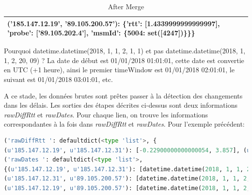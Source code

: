 \begin{landscape}
\begin{table}[H]
{\begin{tabular}{|l|}
							('185.147.12.19', '89.105.200.57'): \{'rtt': [1.4339999999999997], 'probe': ['89.105.202.4'], 'msmId': \{5004: set([4247])\}\}\}
							\\ \hline
						\end{tabular}
					}
					\caption{After Merge}
					\label{tab:aftermergee}
				\end{table}
				
						\begin{table}[H]
							\centering
						\end{table}
Pourquoi datetime.datetime(2018, 1, 1, 2, 1, 1) et pas datetime.datetime(2018, 1, 1, 2, 20, 09) ? 
La date de début est 01/01/2018 01:01:01, cette date est convertie en UTC (+1 heure), ainsi le premier timeWindow est 01/01/2018 02:01:01, le suivant est 01/01/2018 03:01:01, etc.

A ce stade, les données brutes sont prêtes passer à la détection des changements dans les délais. Les sorties des étapes décrites ci-dessus sont deux informations \textit{rawDiffRtt} et \textit{rawDates}. Pour chaque lien, on trouve les informations correspondantes à la fois dans \textit{rawDiffRtt} et \textit{rawDates}. Pour l'exemple précédent:

\begin{lstlisting}[language=Python]
('rawDiffRtt ': defaultdict(<type 'list'>, {
(u'185.147.12.19', u'185.147.12.31'): [-0.22900000000000054, 3.857], (u'185.147.12.31', u'89.105.200.57'): [1.6630000000000003], (u'185.147.12.19', u'89.105.200.57'): [1.4339999999999997]}))
('rawDates ': defaultdict(<type 'list'>, 
{(u'185.147.12.19', u'185.147.12.31'): [datetime.datetime(2018, 1, 1, 2, 1, 1), datetime.datetime(2018, 1, 1, 2, 1, 1)], 
(u'185.147.12.31', u'89.105.200.57'): [datetime.datetime(2018, 1, 1, 2, 1, 1)], 
(u'185.147.12.19', u'89.105.200.57'): [datetime.datetime(2018, 1, 1, 2, 1, 1)]}))
\end{lstlisting}
\end{landscape}

